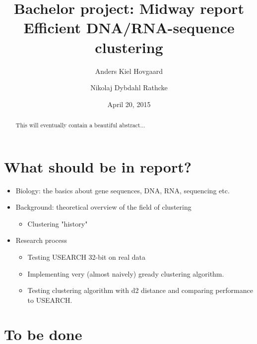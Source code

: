 \documentclass[11pt,a4paper]{article}
\title{Bachelor project: Midway report \\
       \vspace{2mm}
       {\LARGE Efficient DNA/RNA-sequence clustering}}
\author{Anders Kiel Hovgaard \and Nikolaj Dybdahl Rathcke}
\date{April 20, 2015}
\begin{document}
\maketitle
\thispagestyle{empty}
\newpage

\begin{abstract}
  This will eventually contain a beautiful abstract...
\end{abstract}
\thispagestyle{plain}
\newpage

\tableofcontents
\thispagestyle{plain}
\newpage

\thispagestyle{fancy}
\section{What should be in report?}

\begin{itemize}
  \item Biology: the basics about gene sequences, DNA, RNA, sequencing etc.

  \item Background: theoretical overview of the field of clustering
  \begin{itemize}       
      \item Clustering "history"
  \end{itemize}

  \item Research process
    \begin{itemize}
      \item Testing USEARCH 32-bit on real data
      \item Implementing very (almost naively) gready clustering algorithm.
      \item Testing clustering algorithm with d2 distance and comparing
        performance to USEARCH.
    \end{itemize}
\end{itemize}

\section{To be done}

\newpage







\newpage
\nocite{dong, hazelhurst, usearch, uclust}


\end{document}
